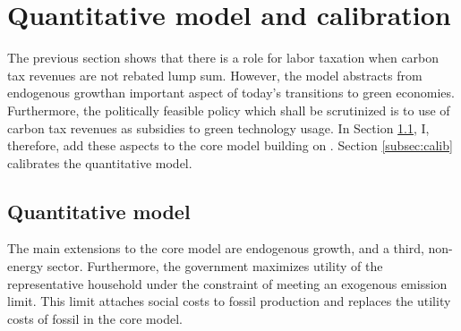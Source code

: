 \section{Quantitative model and calibration}\label{sec:model2}

The previous section shows that there is a role for labor taxation when carbon tax revenues are not rebated lump sum. However, the model abstracts from endogenous growth\textemdash an important aspect of today's transitions to green economies. Furthermore, the politically feasible policy which shall be scrutinized is to use of carbon tax revenues as subsidies to green technology usage. In Section \ref{sec_quantmod}, I, therefore, add these aspects to the core model building on \cite{Fried2018ClimateAnalysis}. %
 Section \ref{subsec:calib} calibrates the quantitative model. 

\subsection{Quantitative model}\label{sec_quantmod}


The main extensions to the core model are endogenous growth, and a third, non-energy sector. %
Furthermore, the government maximizes utility of the representative household under the constraint of meeting an exogenous emission limit. This limit attaches social costs to fossil production and replaces the utility costs of fossil in the core model. 

